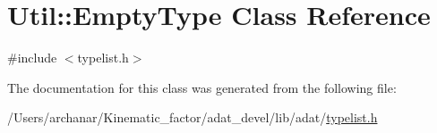 \hypertarget{classUtil_1_1EmptyType}{}\section{Util\+:\+:Empty\+Type Class Reference}
\label{classUtil_1_1EmptyType}


{\ttfamily \#include $<$typelist.\+h$>$}



The documentation for this class was generated from the following file\+:\begin{DoxyCompactItemize}
\item 
/\+Users/archanar/\+Kinematic\+\_\+factor/adat\+\_\+devel/lib/adat/\mbox{\hyperlink{lib_2adat_2typelist_8h}{typelist.\+h}}\end{DoxyCompactItemize}
